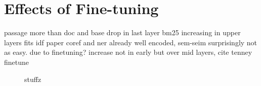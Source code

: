 \section{Effects of Fine-tuning}
passage more than doc and base
drop in last layer
bm25 increasing in upper layers fits idf paper
coref and ner already well encoded, sem-seim surprisingly not as easy. due to finetuning?
increase not in early but over mid layers, cite tenney finetune




\begin{figure}[t]
    \centering
    \begin{subfigure}{\textwidth}
        \centering
    \end{subfigure}

    \begin{subfigure}{\textwidth}
        \centering
    \end{subfigure}

    \caption{stuffz}
    \label{fig:sem_sim_coref}
\end{figure}

